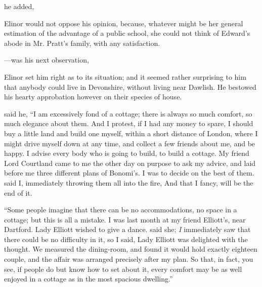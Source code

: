  he added, 

Elinor would not oppose his opinion, because, whatever might be her general estimation of the advantage of a public school, she could not think of Edward's abode in Mr. Pratt's family, with any satisfaction.

---was his next observation, 

Elinor set him right as to its situation; and it seemed rather surprising to him that anybody could live in Devonshire, without living near Dawlish. He bestowed his hearty approbation however on their species of house.

 said he, “I am excessively fond of a cottage; there is always so much comfort, so much elegance about them. And I protest, if I had any money to spare, I should buy a little land and build one myself, within a short distance of London, where I might drive myself down at any time, and collect a few friends about me, and be happy. I advise every body who is going to build, to build a cottage. My friend Lord Courtland came to me the other day on purpose to ask my advice, and laid before me three different plans of Bonomi's. I was to decide on the best of them.  said I, immediately throwing them all into the fire,  And that I fancy, will be the end of it.

“Some people imagine that there can be no accommodations, no space in a cottage; but this is all a mistake. I was last month at my friend Elliott's, near Dartford. Lady Elliott wished to give a dance.  said she;  {\em I} immediately saw that there could be no difficulty in it, so I said,  Lady Elliott was delighted with the thought. We measured the dining-room, and found it would hold exactly eighteen couple, and the affair was arranged precisely after my plan. So that, in fact, you see, if people do but know how to set about it, every comfort may be as well enjoyed in a cottage as in the most spacious dwelling.”

